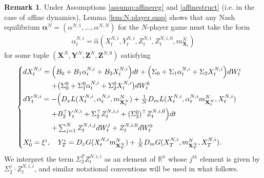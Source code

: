 \documentclass[11pt,reqno]{amsart}
\numberwithin{equation}{section}
\theoremstyle{definition}
\newtheorem{remark}[theorem]{Remark}
\def\R{{\mathbb R}}
\newcommand{\bX}{\mathbf{X}}
\newcommand{\bY}{\mathbf{Y}}
\newcommand{\bZ}{\mathbf{Z}}
\def \R{\mathbb{R}}
\begin{document}
\begin{remark}
\label{rmk:fbsdeaffine}
Under Assumptions \ref{assump:affinereg} and \ref{affinestruct} (i.e. in the case of affine dynamics), Lemma \ref{lem:N.player.smp} shows that any Nash equilibrium $\bm \alpha^N = (\alpha^{N,1},\dots,\alpha^{N,N})$ for the $N$-player game must take the form 
\begin{align*}
    \alpha_t^{N,i} = \widehat{\alpha}(X_t^{N,i}, Y_t^{N,i}, Z_t^{N,i},Z_t^{N,i,0}, m_{\bX_t}^N)
\end{align*}
for some tuple $(\bX^N,\bY^N, \bZ^N, \bZ^{N,0})$ satisfying
\begin{align} \label{eq:nplayerfbsdeaffine}
  \begin{cases} \vspace{.1cm}
    dX_t^{N,i} = \Big(B_0 + B_1 \alpha_t^{N,i} + B_2 X_t^{N,i} \Big) dt + \Big( \Sigma_0 + \Sigma_1 \alpha_t^{N,i} + \Sigma_2 X_t^{N,i}\Big) dW_t^i \\ \vspace{.1cm} \qquad \qquad + \big(\Sigma^0_0 + \Sigma^0_1 \alpha_t^{N,i} + \Sigma^0_2 X_t^{N,i}\big) dW_t^0   \\ \vspace{.1cm}
dY_t^{N,i} = -  \Big(D_x L(X_t^{N,i},\alpha_t^{N,i}, m_{\bX_t^N}^N) + \frac{1}{N} D_m L(X_t^{N,i},\alpha_t^{N,i} m_{\bX_t^N}^N, X_t^{N,i})  \\ \vspace{.1cm}
\qquad \qquad + B_2^\top Y_t^{N,i} + \Sigma_2^\top Z_t^{N,i,i} + (\Sigma_2^0)^\top Z_t^{N,i,0}  \Big)  dt \\ \vspace{.1cm} \qquad \qquad  
+ \sum_{j = 1}^N Z_t^{N,i,j}  dW_t^j + Z_t^{N,i,0}  dW_t^0 \vspace{.1cm}  \\
X_0^i = \xi^i, \quad Y_T^i = D_x G(X_t^{N,i} m_{\bX_T^N}^N) + \frac{1}{N} D_m G(X_T^{N,i}, m_{\bX_T^N}^N, X_T^{N,i}).
\end{cases} 
\end{align}
We interpret the term $\Sigma_2^T Z_t^{N,i,i}$ as an element of $\R^n$ whose $j^{th}$ element is given by $\Sigma_2^j \cdot Z_t^{N,i,i}$, and similar notational conventions will be used in what follows.
\end{remark}
\end{document}
